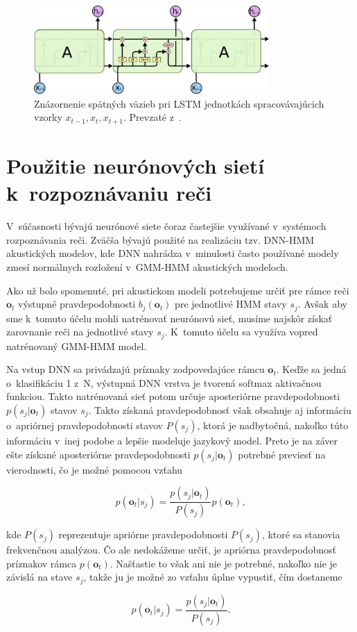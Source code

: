\begin{figure}[ht!]
    \centering
    \includegraphics[width=0.8\textwidth]{figures/LSTM-chain.png}
    \caption{Znázornenie spätných väzieb pri LSTM jednotkách spracovávajúcich vzorky $x_{t-1}, x_t, x_{t+1}$. Prevzaté z~\cite{Olah2015}.}
    \label{fig:LSTM-chain}
\end{figure}

\section{Použitie neurónových sietí k~rozpoznávaniu reči}

V~súčasnosti bývajú neurónové siete čoraz častejšie využívané v~systémoch rozpoznávania reči. Zväčša bývajú použité na realizáciu tzv. DNN-HMM akustických modelov, kde DNN nahrádza v~minulosti často používané modely zmesí normálnych rozložení v~GMM-HMM akustických modeloch. 

Ako už bolo spomenuté, pri akustickom modeli potrebujeme určiť pre rámce reči $\bm{o}_t$ výstupné pravdepodobnosti $b_j(\bm{o}_t)$ pre jednotlivé HMM stavy $s_j$. Avšak aby sme k~tomuto účelu mohli natrénovať neurónovú sieť, musíme najskôr získať zarovnanie reči na jednotlivé stavy $s_j$. K~tomuto účelu sa využíva vopred natrénovaný GMM-HMM model.

Na vstup DNN sa privádzajú príznaky zodpovedajúce rámcu $\bm{o}_t$. Keďže sa jedná o~klasifikáciu 1 z~N, výstupná DNN vrstva je tvorená softmax aktivačnou funkciou. Takto natrénovaná sieť potom určuje aposteriórne pravdepodobnosti $p(s_j|\bm{o}_t)$ stavov $s_j$. Takto získaná pravdepodobnosť však obsahuje aj informáciu o~apriórnej pravdepodobnosti stavov $P(s_j)$, ktorá je nadbytočná, nakoľko túto informáciu v~inej podobe a lepšie modeluje jazykový model. Preto je na záver ešte získané aposteriórne pravdepodobnosti $p(s_j|\bm{o}_t)$ potrebné previesť na vierodnosti, čo je možné pomocou vzťahu

\begin{equation}
    p(\bm{o}_t|s_j) = \frac{p(s_j|\bm{o}_t)}{P(s_j)} p(\bm{o}_t),
\end{equation}

\noindent kde $P(s_j)$ reprezentuje apriórne pravdepodobnosti $P(s_j)$, ktoré sa stanovia frekvenčnou analýzou. Čo ale nedokážeme určiť, je apriórna pravdepodobnosť príznakov rámca $p(\bm{o}_t)$. Našťastie to však ani nie je potrebné, nakoľko nie je závislá na stave $s_j$, takže ju je možné zo vzťahu úplne vypustiť, čím dostaneme

\begin{equation}
    p(\bm{o}_t|s_j) = \frac{p(s_j|\bm{o}_t)}{P(s_j)}.
\end{equation}
